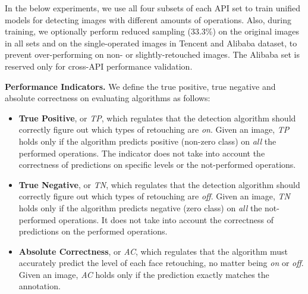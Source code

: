\documentclass[sigconf]{acmart}
\begin{document}
In the below experiments, we use all four subsets of each API set to train unified models for detecting images with different amounts of operations.
Also, during training, we optionally perform reduced sampling (33.3\%) on the original images in all sets and on the single-operated images in Tencent and Alibaba dataset, to prevent over-performing on non- or slightly-retouched images.
The Alibaba set is reserved only for cross-API performance validation.

\noindent\textbf{Performance Indicators.}
\label{section:indicator}
We define the true positive, true negative and absolute correctness on evaluating algorithms as follows:
\begin{itemize}
\item \textbf{True Positive}, or \emph{TP}, which regulates that the detection algorithm should correctly figure out which types of retouching are \textit{on}. Given an image, \emph{TP} holds only if the algorithm predicts positive (non-zero class) on \textit{all} the performed operations.
The indicator does not take into account the correctness of predictions on specific levels or the not-performed operations.
\item \textbf{True Negative}, or \emph{TN}, which regulates that the detection algorithm should correctly figure out which types of retouching are \textit{off}. Given an image, \emph{TN} holds only if the algorithm predicts negative (zero class) on \textit{all} the not-performed operations.
It does not take into account the correctness of predictions on the performed operations.
\item \textbf{Absolute Correctness}, or \textit{AC}, which regulates that the algorithm must accurately predict the level of each face retouching, no matter being \textit{on} or \textit{off}. Given an image, \emph{AC} holds only if the prediction exactly matches the annotation.
\end{itemize}
\end{document}
